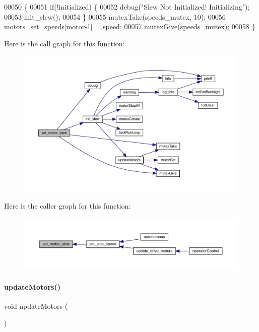 \begin{DoxyCode}
00050                                          \{
00051   \textcolor{keywordflow}{if}(!initialized) \{
00052     debug(\textcolor{stringliteral}{"Slew Not Initialized! Initializing"});
00053     init_slew();
00054   \}
00055   mutexTake(speeds_mutex, 10);
00056   motors_set_speeds[motor-1] = speed;
00057   mutexGive(speeds_mutex);
00058 \}
\end{DoxyCode}
Here is the call graph for this function\+:\nopagebreak
\begin{figure}[H]
\begin{center}
\leavevmode
\includegraphics[width=350pt]{slew_8h_a7dff2b79dffe55fb936d977594d7c01d_cgraph}
\end{center}
\end{figure}
Here is the caller graph for this function\+:\nopagebreak
\begin{figure}[H]
\begin{center}
\leavevmode
\includegraphics[width=350pt]{slew_8h_a7dff2b79dffe55fb936d977594d7c01d_icgraph}
\end{center}
\end{figure}
\mbox{\label{slew_8h_a807a87c5df438fde21c1e8213906695b}} 
\paragraph{update\+Motors()}
{\footnotesize\ttfamily void update\+Motors (\begin{DoxyParamCaption}{ }\end{DoxyParamCaption})}



